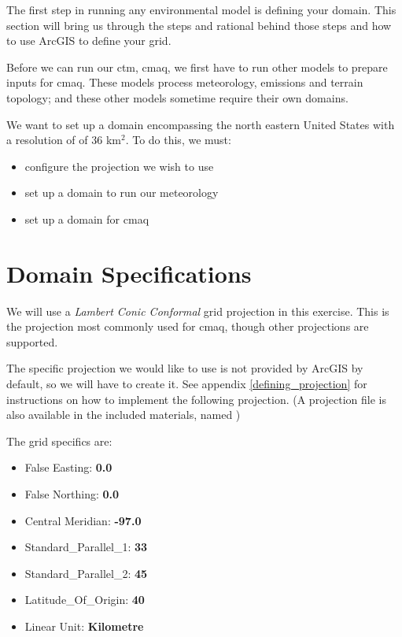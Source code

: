 The first step in running any environmental model is defining your
domain.  This section will bring us through the steps and rational
behind those steps and how to use ArcGIS to define your grid.

Before we can run our \ac{ctm}, \acs{cmaq}, we first have to run other
models to prepare inputs for \acs{cmaq}.  These models process
meteorology, emissions and terrain topology; and these other models
sometime require their own domains.

We want to set up a domain encompassing the north eastern United
States with a resolution of of 36 km$^2$.  To do this, we must:
\begin{itemize}
	\item configure the projection we wish to use
	\item set up a domain to run our meteorology
	\item set up a domain for \acs{cmaq}
\end{itemize}


\section{Domain Specifications}

We will use a \emph{Lambert Conic Conformal} grid projection in this exercise.
This is the projection most commonly used for \acs{cmaq}, though other
projections are supported.

The specific projection we would like to use is not provided by ArcGIS by
default, so we will have to create it.  See appendix \ref{defining_projection}
for instructions on how to implement the following projection.  (A projection
file is also available in the included materials, named
)


The grid specifics are:
\begin{itemize}
	\item False Easting: \textbf{0.0}
	\item False Northing: \textbf{0.0}
	\item Central Meridian: \textbf{-97.0}
	\item Standard\_Parallel\_1: \textbf{33}
	\item Standard\_Parallel\_2: \textbf{45}
	\item Latitude\_Of\_Origin: \textbf{40}
	\item Linear Unit: \textbf{Kilometre}
\end{itemize}

